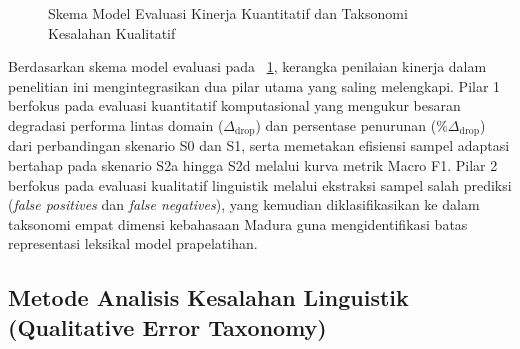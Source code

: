 \begin{figure}[H]
\caption{Skema Model Evaluasi Kinerja Kuantitatif dan Taksonomi Kesalahan Kualitatif}
\label{fig:model_evaluasi}
\end{figure}

Berdasarkan skema model evaluasi pada \figurename~\ref{fig:model_evaluasi}, kerangka penilaian kinerja dalam penelitian ini mengintegrasikan dua pilar utama yang saling melengkapi. Pilar 1 berfokus pada evaluasi kuantitatif komputasional yang mengukur besaran degradasi performa lintas domain ($\Delta_{\text{drop}}$) dan persentase penurunan ($\%\Delta_{\text{drop}}$) dari perbandingan skenario S0 dan S1, serta memetakan efisiensi sampel adaptasi bertahap pada skenario S2a hingga S2d melalui kurva metrik Macro F1. Pilar 2 berfokus pada evaluasi kualitatif linguistik melalui ekstraksi sampel salah prediksi (\textit{false positives} dan \textit{false negatives}), yang kemudian diklasifikasikan ke dalam taksonomi empat dimensi kebahasaan Madura guna mengidentifikasi batas representasi leksikal model prapelatihan.

\subsection{Metode Analisis Kesalahan Linguistik (Qualitative Error Taxonomy)}

